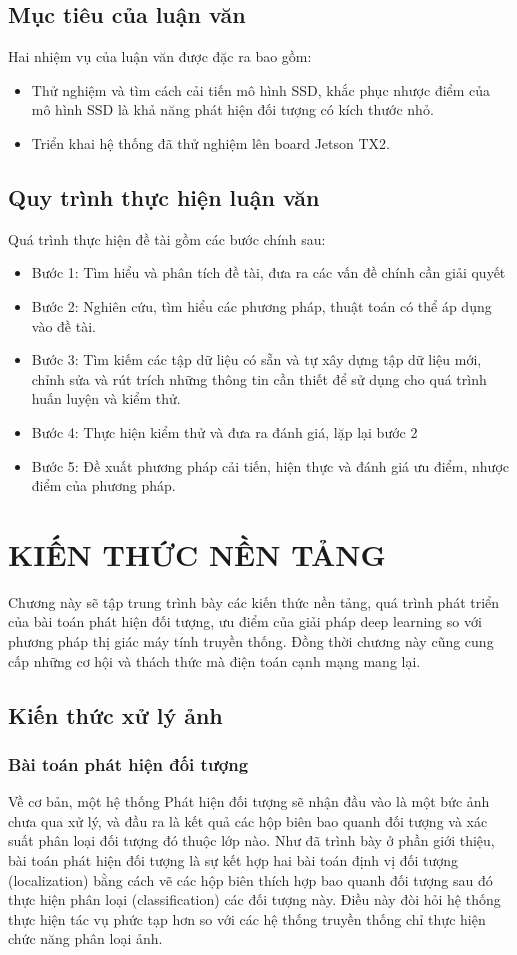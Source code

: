 \documentclass[a4paper]{report}
\begin{document}
\section{Mục tiêu của luận văn}
Hai nhiệm vụ của luận văn được đặc ra bao gồm:
\begin{itemize}
\item Thử nghiệm và tìm cách cải tiến mô hình SSD, khắc phục nhược điểm của mô hình SSD là khả năng phát hiện đối tượng có kích thước nhỏ.
\item Triển khai hệ thống đã thử nghiệm lên board Jetson TX2.
\end{itemize} 

\section{Quy trình thực hiện luận văn}
Quá trình thực hiện đề tài gồm các bước chính sau: 
\begin{itemize}
	\item  Bước 1: Tìm hiểu và phân tích đề tài, đưa ra các vấn đề chính cần giải quyết
	\item  Bước 2: Nghiên cứu, tìm hiểu các phương pháp, thuật toán có thể áp dụng vào đề tài.
	\item  Bước 3: Tìm kiếm các tập dữ liệu có sẵn và tự xây dựng tập dữ liệu mới, chỉnh sửa và rút trích những thông tin cần thiết để sử dụng cho quá trình huấn luyện và kiểm thử. 
	\item  Bước 4: Thực hiện kiểm thử và đưa ra đánh giá, lặp lại bước 2
	\item  Bước 5: Đề xuất phương pháp cải tiến, hiện thực và đánh giá ưu điểm, nhược điểm của phương pháp.
\end{itemize} 

\chapter{KIẾN THỨC NỀN TẢNG}
Chương này sẽ tập trung trình bày các kiến thức nền tảng, quá trình phát triển của bài 
toán phát hiện đối tượng, ưu điểm của giải pháp deep learning so với phương pháp thị giác 
máy tính truyền thống. Đồng thời chương này cũng cung cấp những cơ hội và thách thức mà 
điện toán cạnh mạng mang lại. 

\section{Kiến thức xử lý ảnh}
\subsection{Bài toán phát hiện đối tượng}
Về cơ bản, một hệ thống Phát hiện đối tượng sẽ nhận đầu vào là một bức ảnh chưa qua xử lý, 
và đầu ra là kết quả các hộp biên bao quanh đối tượng và xác suất phân loại đối tượng đó 
thuộc lớp nào. Như đã trình bày ở phần giới thiệu, bài toán phát hiện đối tượng là sự kết
hợp hai bài toán định vị đối tượng (localization) bằng cách vẽ các hộp biên thích hợp bao 
quanh đối tượng sau đó thực hiện phân loại (classification) các đối tượng này. Điều này đòi 
hỏi hệ thống thực hiện tác vụ phức tạp hơn so với các hệ thống truyền thống chỉ thực hiện
chức năng phân loại ảnh. 
\end{document}
